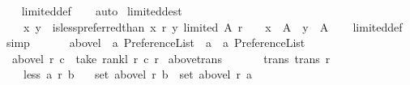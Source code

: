 \begin{isabellebody}
%
\isadelimproof
\ \ %
\endisadelimproof
%
\isatagproof
{}\isamarkupfalse%
\ limited{\isacharunderscore}{\kern0pt}def\isanewline
\ \ \isamarkupfalse%
\ auto%
\endisatagproof
{\isafoldproof}%
%
\isadelimproof
\isanewline
%
\endisadelimproof
\isanewline
{}\isamarkupfalse%
\ limited{\isacharunderscore}{\kern0pt}dest{\isacharcolon}{\kern0pt}\ \isanewline
\ \ \ {\isachardoublequoteopen}{\isacharparenleft}{\kern0pt}{\isasymAnd}\ x\ y{\isachardot}{\kern0pt}\ {\isasymlbrakk}\ is{\isacharunderscore}{\kern0pt}less{\isacharunderscore}{\kern0pt}preferred{\isacharunderscore}{\kern0pt}than\ x\ r\ y{\isacharsemicolon}{\kern0pt}\ limited\ A\ r\ {\isasymrbrakk}\ {\isasymLongrightarrow}\ \ x\ {\isasymin}\ A\ {\isasymand}\ y\ {\isasymin}\ A{\isacharparenright}{\kern0pt}{\isachardoublequoteclose}\isanewline
%
\isadelimproof
\ \ %
\endisadelimproof
%
\isatagproof
{}\isamarkupfalse%
\ limited{\isacharunderscore}{\kern0pt}def\ \isamarkupfalse%
\ {\isacharparenleft}{\kern0pt}simp{\isacharparenright}{\kern0pt}%
\endisatagproof
{\isafoldproof}%
%
\isadelimproof
\ \ \isanewline
%
\endisadelimproof
\ \ \isanewline
{}\isamarkupfalse%
\ above{\isacharunderscore}{\kern0pt}l\ {\isacharcolon}{\kern0pt}{\isacharcolon}{\kern0pt}\ {\isachardoublequoteopen}{\isacharprime}{\kern0pt}a\ Preference{\isacharunderscore}{\kern0pt}List\ {\isasymRightarrow}\ {\isacharprime}{\kern0pt}a\ {\isasymRightarrow}\ {\isacharprime}{\kern0pt}a\ Preference{\isacharunderscore}{\kern0pt}List{\isachardoublequoteclose}\ \isanewline
\ \ {\isachardoublequoteopen}above{\isacharunderscore}{\kern0pt}l\ r\ c\ {\isasymequiv}\ take\ {\isacharparenleft}{\kern0pt}rank{\isacharunderscore}{\kern0pt}l\ r\ c{\isacharparenright}{\kern0pt}\ r{\isachardoublequoteclose}\isanewline
\isanewline
{}\isamarkupfalse%
\ above{\isacharunderscore}{\kern0pt}trans{\isacharcolon}{\kern0pt}\isanewline
\ \ \isanewline
\ \ \ \ trans{\isacharcolon}{\kern0pt}\ {\isachardoublequoteopen}trans\ r{\isachardoublequoteclose}\ \isanewline
\ \ \ \ less{\isacharcolon}{\kern0pt}\ {\isachardoublequoteopen}a\ {\isasymlesssim}\isactrlsub r\ b{\isachardoublequoteclose}\isanewline
\ \ \ {\isachardoublequoteopen}set\ {\isacharparenleft}{\kern0pt}above{\isacharunderscore}{\kern0pt}l\ r\ b{\isacharparenright}{\kern0pt}\ {\isasymsubseteq}\ set\ {\isacharparenleft}{\kern0pt}above{\isacharunderscore}{\kern0pt}l\ r\ a{\isacharparenright}{\kern0pt}{\isachardoublequoteclose}\isanewline

\end{isabellebody}
